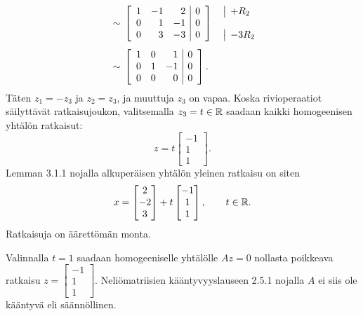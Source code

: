 \documentclass[11pt,a4paper]{amsart}
\begin{document}
\begin{solution}
\[\begin{aligned}
      &\sim{}
      \left[
        \begin{array}{rrr|r}
          1 & -1 & 2 & 0 \\
          0 & 1 & -1 & 0 \\
          0 & 3 & -3 & 0
        \end{array}
      \right]
      \quad
      \begin{array}{@{}l@{}}
        \smash{\rowop{+R_2}} \\
        {} \\
        \smash{\rowop{-3R_2}}
      \end{array}
      \\[1ex]
      &\sim{}
      \left[
        \begin{array}{rrr|r}
          1 & 0 & 1 & 0 \\
          0 & 1 & -1 & 0 \\
          0 & 0 & 0 & 0
        \end{array}
      \right].
    \end{aligned}
  \]
  Täten \(z_1=-z_3\) ja \(z_2=z_3\), ja muuttuja \(z_3\) on
  vapaa. Koska rivioperaatiot säilyttävät ratkaisujoukon,
  valitsemalla \(z_3=t\in\mathbb{R}\) saadaan kaikki homogeenisen
  yhtälön ratkaisut:
  \[
    z=t
    \begin{bmatrix}-1 \\ 1 \\ 1
    \end{bmatrix}.
  \]
  Lemman 3.1.1 nojalla alkuperäisen yhtälön yleinen ratkaisu on siten
  \[
    x=
    \begin{bmatrix}2 \\ -2 \\ 3
    \end{bmatrix}
    +t
    \begin{bmatrix}-1 \\ 1 \\ 1
    \end{bmatrix},
    \qquad t\in\mathbb{R}.
  \]
  Ratkaisuja on äärettömän monta.

  Valinnalla \(t=1\) saadaan homogeeniselle yhtälölle \(Az=0\)
  nollasta poikkeava ratkaisu
  \(z=
    \begin{bmatrix}-1 \\ 1 \\ 1
  \end{bmatrix}\).
  Neliömatriisien kääntyvyyslauseen 2.5.1 nojalla \(A\) ei siis
  ole kääntyvä eli säännöllinen.
\end{solution}
\end{document}
